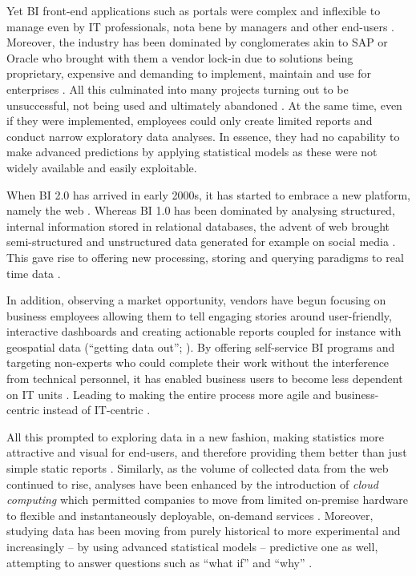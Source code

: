 Yet \ac{BI} front-end applications such as portals were complex and inflexible to manage even by \ac{IT} professionals, nota bene by managers and other end-users \parencites{Collier2011}.
Moreover, the industry has been dominated by conglomerates akin to SAP or Oracle who brought with them a vendor lock-in due to solutions being proprietary, expensive and demanding to implement, maintain and use for enterprises \parencite{Joly2016}. 
All this culminated into many projects turning out to be unsuccessful, not being used and ultimately abandoned \parencite{Collier2011}.
At the same time, even if they were implemented, employees could only create limited reports and conduct narrow exploratory data analyses.
In essence, they had no capability to make advanced predictions by applying statistical models as these were not widely available and easily exploitable.

When \ac{BI} 2.0 has arrived in early 2000s, it has started to embrace a new platform, namely the web \parencite{BI2.0Ov2012}.
Whereas \ac{BI} 1.0 has been dominated by analysing structured, internal information stored in relational databases, the advent of web brought semi-structured and unstructured data generated for example on social media \parencite{realTimeBIContinental2006}.
This gave rise to  offering new processing, storing and querying paradigms to real time data \parencites[5]{Davenport2013Analytics3.0}{loukides2011data}.

In addition, observing a market opportunity, vendors have begun focusing on business employees allowing them to tell engaging stories around user-friendly, interactive dashboards and creating actionable reports coupled for instance with geospatial data (\enquote{getting data out}; \cite{Firtik2017VizualizaceNastroju, Hejdanek2016NavrhIntelligencequot, loukides2011data, WatsonBiDatagettingIN2007}).
By offering self-service \ac{BI} programs and targeting non-experts who could complete their work without the interference from technical personnel, it has enabled business users to become less dependent on \ac{IT} units \parencite{Heinze2014HistoryIntelligence}. 
Leading to making the entire process more agile and business-centric instead of IT-centric \parencite{Joly2016}.

All this prompted to exploring data in a new fashion, making statistics more attractive and visual for end-users, and therefore providing them better than just simple static reports \parencite{IndBIHistory2013}.
Similarly, as the volume of collected data from the web continued to rise, analyses have been enhanced by the introduction of \emph{cloud computing} which permitted companies to move from limited on-premise hardware to flexible and instantaneously deployable, on-demand services \parencite{BI2.0Ov2012}. 
Moreover, studying data has been moving from purely historical to more experimental and increasingly -- by using advanced statistical models -- predictive one as well, attempting to answer questions such as \enquote{what if} and \enquote{why} \parencites{Chen2012}{Boris2015}.

